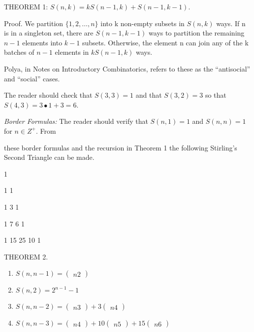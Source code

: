 \documentclass[10pt,letter]{article}
\begin{document}
THEOREM 1:
\(S\left( n,k \right) = kS\left( n - 1,k \right) + S(n - 1,k - 1)\).

Proof. We partition \(\{ 1,2,\ldots,n\}\) into k non-empty subsets in
\(S(n,k)\) ways. If n is in a singleton set, there are
\(S(n - 1,k - 1)\) ways to partition the remaining \(n - 1\) elements
into \(k - 1\) subsets. Otherwise, the element n can join any of the k
batches of \(n - 1\) elements in \(kS(n - 1,k)\) ways.

Polya, in Notes on Introductory Combinatorics, refers to these as the
``antisocial'' and ``social'' cases.

The reader should check that \(S\left( 3,3 \right) = 1\) and that
\(S\left( 3,2 \right) = 3\) so that
\(S\left( 4,3 \right) = 3 \bullet 1 + 3 = 6\).

\emph{Border Formulas:} The reader should verify that
\(S\left( n,1 \right) = 1\) and \(S\left( n,n \right) = 1\) for
\(n \in Z^{+}\). From

these border formulas and the recursion in Theorem 1 the following
Stirling's Second Triangle can be made.

1

1 1

1 3 1

1 7 6 1

1 15 25 10 1

THEOREM 2.

\begin{enumerate}
\def\labelenumi{(\alph{enumi})}

\item
  \(S\left( n,n - 1 \right) =

\begin{pmatrix}
  n 
  2 
  \end{pmatrix}
\)
\item
  \(S\left( n,2 \right) = 2^{n - 1} - 1\)
\item
  \(S\left( n,n - 2 \right) =

\begin{pmatrix}
  n 
  3 
  \end{pmatrix}
 + 3

\begin{pmatrix}
  n 
  4 
  \end{pmatrix}
\)
\item
  \(S\left( n,n - 3 \right) =

\begin{pmatrix}
  n 
  4 
  \end{pmatrix}
 + 10

\begin{pmatrix}
  n 
  5 
  \end{pmatrix}
 + 15

\begin{pmatrix}
  n 
  6 
  \end{pmatrix}
\)

\end{enumerate}
\end{document}
